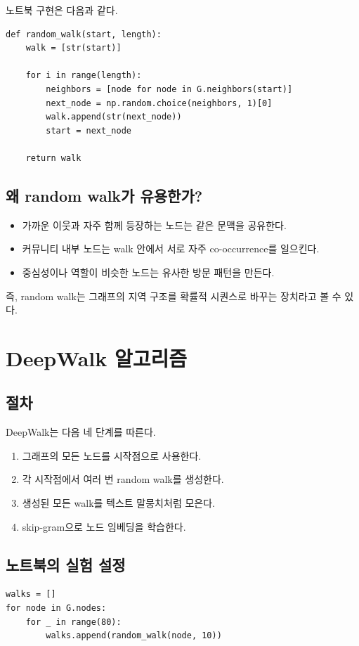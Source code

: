 \documentclass[11pt,a4paper]{article}
\begin{document}
노트북 구현은 다음과 같다.

\begin{lstlisting}
def random_walk(start, length):
    walk = [str(start)]

    for i in range(length):
        neighbors = [node for node in G.neighbors(start)]
        next_node = np.random.choice(neighbors, 1)[0]
        walk.append(str(next_node))
        start = next_node

    return walk
\end{lstlisting}

\subsection{왜 random walk가 유용한가?}
\begin{itemize}[leftmargin=*]
  \item 가까운 이웃과 자주 함께 등장하는 노드는 같은 문맥을 공유한다.
  \item 커뮤니티 내부 노드는 walk 안에서 서로 자주 co-occurrence를 일으킨다.
  \item 중심성이나 역할이 비슷한 노드는 유사한 방문 패턴을 만든다.
\end{itemize}

즉, random walk는 그래프의 지역 구조를 확률적 시퀀스로 바꾸는 장치라고 볼 수 있다.

\section{DeepWalk 알고리즘}

\subsection{절차}
DeepWalk는 다음 네 단계를 따른다.
\begin{enumerate}[leftmargin=*]
  \item 그래프의 모든 노드를 시작점으로 사용한다.
  \item 각 시작점에서 여러 번 random walk를 생성한다.
  \item 생성된 모든 walk를 텍스트 말뭉치처럼 모은다.
  \item skip-gram으로 노드 임베딩을 학습한다.
\end{enumerate}

\subsection{노트북의 실험 설정}
\begin{lstlisting}
walks = []
for node in G.nodes:
    for _ in range(80):
        walks.append(random_walk(node, 10))
\end{lstlisting}
\end{document}

